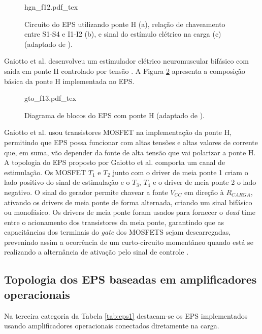 
\begin{figure}
    \centering %
    \small %
    \def\svgwidth{0.9
    \columnwidth}%
    {hgn_f12.pdf_tex}
    \caption{Circuito do EPS utilizando ponte H (a), relação de chaveamento entre S1-S4 e I1-I2 (b), e sinal do estímulo elétrico na carga (c) (adaptado de \cite{Hongen2011}).}
    \label{fig:hgn_f12}
\end{figure}

Gaiotto et al. desenvolveu um estimulador elétrico neuromuscular bifásico com saída em ponte H controlado por tensão \cite{Gaiotto2012}. A Figura \ref{fig:gto_f13} apresenta a composição básica da ponte H implementada no \acrshort{EPS}.

\begin{figure}
    \centering %
    \small %
    \def\svgwidth{0.9
    \columnwidth}%
    {gto_f13.pdf_tex}
    \caption{Diagrama de blocos do EPS com ponte H (adaptado de \cite{Gaiotto2012}).}
    \label{fig:gto_f13}
\end{figure}

Gaiotto et al. usou transistores MOSFET na implementação da ponte H, permitindo que EPS possa funcionar com altas tensões e altas valores de corrente que, em suma, vão depender da fonte de alta tensão que vai polarizar a ponte H. A topologia do \acrshort{EPS} proposto por Gaiotto et al. comporta um canal de estimulação. Os MOSFET $T_{1}$ e $T_{2}$ junto com o driver de meia ponte 1 criam o lado positivo do sinal de estimulação e o $T_{3}$, $T_{4}$ e o driver de meia ponte 2 o lado negativo. O sinal do gerador permite chavear a fonte $V_{CC}$ em direção à $R_{CARGA}$, ativando os drivers de meia ponte de forma alternada, criando um sinal bifásico ou monofásico. Os drivers de meia ponte foram usados para fornecer o \textit{dead} time entre o acionamento dos transistores da meia ponte, garantindo que as capacitâncias dos terminais do \textit{gate} dos MOSFETS sejam descarregadas, prevenindo assim a ocorrência de um curto-circuito momentâneo quando está se realizando a alternância de ativação pelo sinal de controle \cite{Gaiotto2012}.

\subsection*{Topologia dos \acrshort{EPS} baseadas em amplificadores operacionais}
Na terceira categoria da Tabela \ref{tab:eps1} destacam-se os \acrshort{EPS} implementados usando amplificadores operacionais conectados diretamente na carga. 

